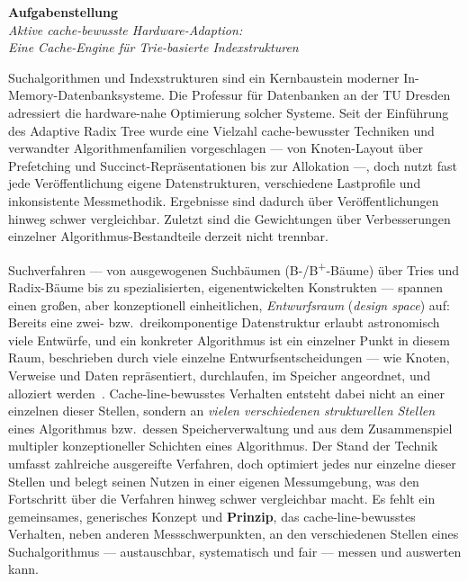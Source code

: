 {\large\textbf{Aufgabenstellung}}\\[0.4em]
{\itshape Aktive cache-bewusste Hardware-Adaption:\\ Eine Cache-Engine für Trie-basierte Indexstrukturen\/}

\bigskip
{}
Suchalgorithmen und Indexstrukturen sind ein Kernbaustein moderner In-Memory-Datenbanksysteme. Die
Professur für Datenbanken an der TU Dresden adressiert die hardware-nahe Optimierung solcher
Systeme. Seit der Einführung des Adaptive Radix Tree wurde eine Vielzahl cache-bewusster Techniken
und verwandter Algorithmenfamilien vorgeschlagen --- von Knoten-Layout über Prefetching und
Succinct-Repräsentationen bis zur Allokation ---, doch nutzt fast jede Veröffentlichung eigene
Datenstrukturen, verschiedene Lastprofile und inkonsistente Messmethodik. Ergebnisse sind dadurch
über Veröffentlichungen hinweg schwer vergleichbar. Zuletzt sind die Gewichtungen über
Verbesserungen einzelner Algorithmus-Bestandteile derzeit nicht trennbar.

Suchverfahren --- von ausgewogenen Suchbäumen (B-/B\textsuperscript{+}-Bäume) über Tries und
Radix-Bäume bis zu spezialisierten, eigenentwickelten Konstrukten --- spannen einen großen, aber
konzeptionell einheitlichen, \emph{Entwurfsraum} (\emph{design space}) auf: Bereits eine zwei-
bzw.\ dreikomponentige Datenstruktur erlaubt astronomisch viele Entwürfe, und ein konkreter
Algorithmus ist ein einzelner Punkt in diesem Raum, beschrieben durch viele einzelne
Entwurfsentscheidungen --- wie Knoten, Verweise und Daten repräsentiert, durchlaufen, im Speicher
angeordnet, und alloziert werden~\cite{idreos2018periodic, idreos2018datacalculator}.
Cache-line-bewusstes Verhalten entsteht dabei nicht an einer einzelnen dieser Stellen, sondern an
\emph{vielen verschiedenen strukturellen Stellen} eines Algorithmus bzw.\ dessen Speicherverwaltung
und aus dem Zusammenspiel multipler konzeptioneller Schichten eines Algorithmus. Der Stand der
Technik umfasst zahlreiche ausgereifte Verfahren, doch optimiert jedes nur einzelne dieser Stellen
und belegt seinen Nutzen in einer eigenen Messumgebung, was den Fortschritt über die Verfahren
hinweg schwer vergleichbar macht. Es fehlt ein gemeinsames, generisches Konzept und
\textbf{Prinzip}, das cache-line-bewusstes Verhalten, neben anderen Messschwerpunkten, an den
verschiedenen Stellen eines Suchalgorithmus --- austauschbar, systematisch und fair --- messen und
auswerten kann.

